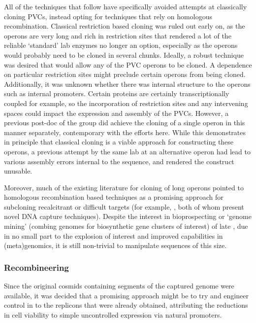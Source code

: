 All of the techniques that follow have specifically avoided attempts at classically cloning PVCs, instead opting for techniques that rely on homologous recombination. Classical restriction based cloning was ruled out early on, as the operons are very long and rich in restriction sites that rendered a lot of the reliable `standard' lab enzymes no longer an option, especially as the operons would probably need to be cloned in several chunks. Ideally, a robust technique was desired that would allow any of the PVC operons to be cloned. A dependence on particular restriction sites might preclude certain operons from being cloned. Additionally, it was unknown whether there was internal structure to the operons such as internal promoters. Certain proteins are certainly transcriptionally coupled for example, so the incorporation of restriction sites and any intervening spaces could impact the expression and assembly of the PVCs. However, a previous post-doc of the group did achieve the cloning of a single operon in this manner separately, contemporary with the efforts here. While this demonstrates in principle that classical cloning is a viable approach for constructing these operons, a previous attempt by the same lab at an alternative operon had lead to various assembly errors internal to the sequence, and rendered the construct unusable.

Moreover, much of the existing literature for cloning of long operons pointed to homologous recombination based techniques as a promising approach for subcloning recalcitrant or difficult targets (for example, \cite{Wang2016, Garcia2004}, both of whom present novel DNA capture techniques). Despite the interest in bioprospecting or `genome mining' (combing genomes for biosynthetic gene clusters of interest) of late \citep{Ziemert2016, VanLanen2006, Netta2009, Lautru2005, Bergmann2007, Wenzel2009, Charlop-Powers2014}, due in no small part to the explosion of interest and improved capabilities in (meta)genomics, it is still non-trivial to manipulate sequences of this size.

\subsubsection{Recombineering}
Since the original cosmids containing segments of the captured genome were available, it was decided that a promising approach might be to try and engineer control in to the replicons that were already obtained, attributing the reductions in cell viability to simple uncontrolled expression via natural promoters.

